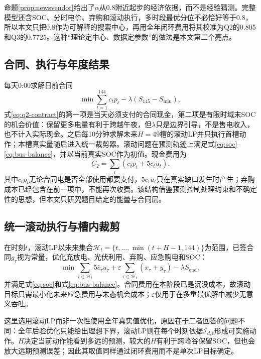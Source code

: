 \documentclass[UTF8,12pt,a4paper]{ctexart}
\theoremstyle{remark}
\begin{document}
命题\ref{prop:newsvendor}给出了$\alpha$从0.8附近起步的经济依据，而不是经验猜测。完整模型还含SOC、分时电价、弃购和滚动执行，多时段最优分位不必恰好等于0.8，所以本文只把0.8作为可解释的搜索中心，再用全年闭环费用将其校准为Q2的0.805和Q3的0.7725。这种“理论定中心、数据定参数”的做法是本文第二个亮点。

\subsection{合同、执行与年度结果}
每天0:00求解日前合同
\begin{equation}\min\sum_{t=1}^{144}c_tp_t-\lambda(S_{145}-S_{\min}),\label{eq:q2-contract}\end{equation}
式\eqref{eq:q2-contract}的第一项是当天必须支付的合同现金，第二项是有限时域末SOC的机会价值：保留更多电量有利于跨越午夜，但$\lambda$只是边界引导，不是售电收入，也不计入实际现金。之后每10分钟求解未来$H=49$槽的滚动LP并只执行首槽动作；本槽真实量随后进入统一裁剪器。滚动问题在预测轨迹上满足式\eqref{eq:soc}--\eqref{eq:bus-balance}，并以当前真实SOC作为初值。现金费用为
\begin{equation}C_2=\sum_t(c_tp_t+5c_tu_t).\label{eq:q2-cash}\end{equation}
其中$c_tp_t$无论合同电是否全部使用都要支付，$5c_tu_t$只在真实缺口发生时产生；弃购成本已经包含在前一项中，不能再次收费。该结构借鉴预测控制处理约束和不确定性的思想\cite{hu2021mpc,schwenzer2021mpc}，但本文只研究题目给定的能量与合同层。

\subsection{统一滚动执行与槽内裁剪}
在时刻$t$，滚动LP以未来集合$\mathcal H_t=\{t,\ldots,\min(t+H-1,144)\}$为范围，已签合同$g_\tau$视为常量，优化充放电、光伏利用、弃购、应急购电和SOC：
\begin{equation}
\min \sum_{\tau\in\mathcal H_t}5\widehat c_\tau u_\tau
+\varepsilon\sum_{\tau\in\mathcal H_t}(x_\tau+y_\tau)-\lambda S_{\mathrm{end}},
\label{eq:rolling-obj}
\end{equation}
并满足式\eqref{eq:soc}和式\eqref{eq:bus-balance}。合同费用在本阶段已是沉没成本，故滚动目标只需最小化未来应急费用与末态机会成本；$\varepsilon$仅用于在多重最优解中减少无意义吞吐。

这里选用滚动LP而非一次性使用全年真实值优化，原因在于二者回答的问题不同：全年后验优化只能给出理想下界，滚动LP则在每个时刻依据$\mathcal I_{d,t}$形成可实施动作。$H$决定当前动作能看到多远的预测，较大的$H$有利于跨峰谷保留SOC，但也会放大远期预测误差；因此其取值同样通过闭环费用而不是单次LP目标确定。
\end{document}
